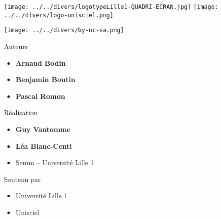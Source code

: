 








\begin{frame}

\thispagestyle{empty}    

  \hspace*{-20ex}
  \begin{minipage}{0.6\textwidth}
  \begin{center}
    \vspace*{5ex}   


    \bigskip

    \texttt{[image: ../../divers/logotypeLille1-QUADRI-ECRAN.jpg]}
    \quad
    \texttt{[image: ../../divers/logo-unisciel.png]}

    \vspace*{5ex}

    \texttt{[image: ../../divers/by-nc-sa.png]}
  \end{center}
  \end{minipage}
  \hfil
  \begin{minipage}{0.45\textwidth}
  \vspace*{5ex}
  Auteurs
  \begin{itemize}
    \item {\bf Arnaud Bodin}
    \item {\bf Benjamin Boutin}
    \item {\bf Pascal Romon}
  \end{itemize}

  \medskip

  Réalisation
  \begin{itemize}
    \item {\bf Guy Vantomme}
    \item {\bf Léa Blanc-Centi}
    \item Semm -- Université Lille 1
  \end{itemize}

  \medskip

  Soutenu par 
  \begin{itemize}
    \item Université Lille 1
    \item Unisciel
  \end{itemize}

  \end{minipage}  



\end{frame}



